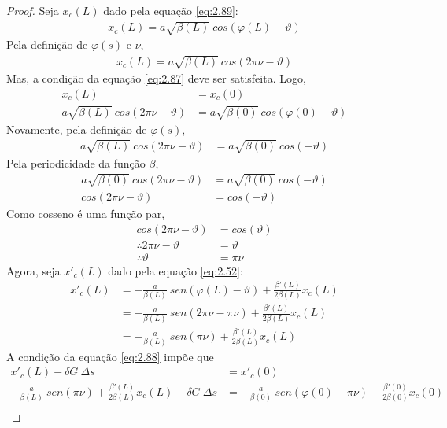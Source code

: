 \begin{proof}
	Seja $x_c(L)$ dado pela equação \eqref{eq:2.89}:
	\begin{align*}
		x_c(L) = a\sqrt{\beta(L)}\ cos(\varphi(L)-\vartheta)
	\end{align*}
	Pela definição de $\varphi(s)$ e $\nu$,
	\begin{align*}
		x_c(L) = a\sqrt{\beta(L)}\ cos(2\pi\nu-\vartheta)
	\end{align*}
	Mas, a condição da equação \eqref{eq:2.87} deve ser satisfeita. Logo,
	\begin{align*}
		x_c(L) &= x_c(0)\\
		a\sqrt{\beta(L)}\ cos(2\pi\nu-\vartheta) &= a\sqrt{\beta(0)}\ cos(\varphi(0)-\vartheta)
	\end{align*}
	Novamente, pela definição de $\varphi(s)$,
	\begin{align*}
		a\sqrt{\beta(L)}\ cos(2\pi\nu-\vartheta) &= a\sqrt{\beta(0)}\ cos(-\vartheta)
	\end{align*}
	Pela periodicidade da função $\beta$,
	\begin{align*}
		a\sqrt{\beta(0)}\ cos(2\pi\nu-\vartheta) &= a\sqrt{\beta(0)}\ cos(-\vartheta)\\
		cos(2\pi\nu-\vartheta) &= cos(-\vartheta)
	\end{align*}
	Como cosseno é uma função par,
	\begin{align*}
		cos(2\pi\nu-\vartheta) &= cos(\vartheta)\\
		\therefore 2\pi\nu - \vartheta &= \vartheta\\
		\therefore \vartheta &= \pi\nu
	\end{align*}
	Agora, seja $x'_c(L)$ dado pela equação \eqref{eq:2.52}:
	\begin{align*}
		x'_c(L) &= -\frac{a}{\beta(L)}\ sen(\varphi(L)-\vartheta) + \frac{\beta'(L)}{2\beta(L)}x_c(L)\\
				&= -\frac{a}{\beta(L)}\ sen(2\pi\nu-\pi\nu) + \frac{\beta'(L)}{2\beta(L)}x_c(L)\\
				&= -\frac{a}{\beta(L)}\ sen(\pi\nu) + \frac{\beta'(L)}{2\beta(L)}x_c(L)
	\end{align*}
	A condição da equação \eqref{eq:2.88} impõe que
	\begin{align*}
		x'_c(L) - \delta G\ \Delta s &= x'_c(0)\\
		-\frac{a}{\beta(L)}\ sen(\pi\nu) + \frac{\beta'(L)}{2\beta(L)}x_c(L) - \delta G\ \Delta s &= -\frac{a}{\beta(0)}\ sen(\varphi(0)-\pi\nu) + \frac{\beta'(0)}{2\beta(0)}x_c(0)\\

\end{align*}
\end{proof}
